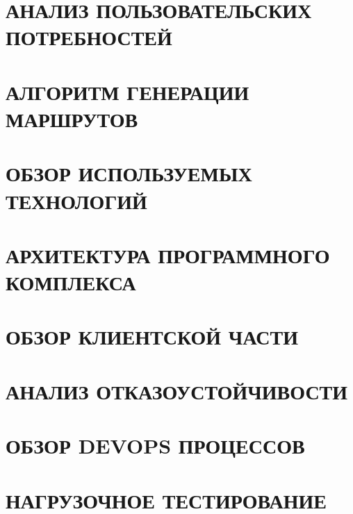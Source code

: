 \documentclass[a4paper,14pt,russian]{extreport}
\begin{document}
    
    
    \tableofcontents
    
    \newpage
    
    
    \chapter{АНАЛИЗ ПОЛЬЗОВАТЕЛЬСКИХ ПОТРЕБНОСТЕЙ}
    
    
    \chapter{АЛГОРИТМ ГЕНЕРАЦИИ МАРШРУТОВ}
    
    
    \chapter{ОБЗОР ИСПОЛЬЗУЕМЫХ ТЕХНОЛОГИЙ}
    
    
    \chapter{АРХИТЕКТУРА ПРОГРАММНОГО КОМПЛЕКСА}
    
    
    \chapter{ОБЗОР КЛИЕНТСКОЙ ЧАСТИ}
    
    
    \chapter{АНАЛИЗ ОТКАЗОУСТОЙЧИВОСТИ}
    
    
    \chapter{ОБЗОР DEVOPS ПРОЦЕССОВ}
    
    
    \chapter{НАГРУЗОЧНОЕ ТЕСТИРОВАНИЕ}
    
    
    \newpage
    
    
    \newpage
    
    
    \newpage
    \listoffigures
    \newpage
    \listoftables
    \newpage
    \listoflistings
\end{document}
